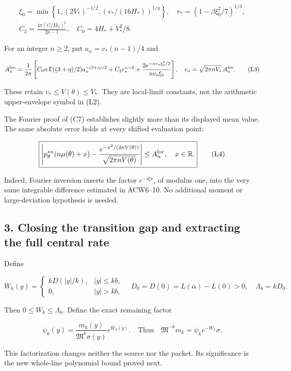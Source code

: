\[
\begin{gathered}
\xi_0=\min\left\{1,(2V_*)^{-1/2},
(v_*/(16H_*))^{1/\eta}\right\},\quad
r_*=(1-\beta\xi_0^2/7)^{1/3},\\
C_2=\frac{4\pi(C/M_0)^2}{2p-1},\quad C_0=4H_*+V_*^2/8.
\end{gathered}
\]

For an integer \(n\ge2\), put \(a_n=v_*(n-1)/4\) and

\[
A_n^{\rm loc}=\frac1{2\pi}\left[
C_0n\,\Gamma((3+\eta)/2)a_n^{-(3+\eta)/2}
+C_2r_*^{n-2}+
\frac{2e^{-nv_*\xi_0^2/2}}{nv_*\xi_0}\right],
\quad\epsilon_n=\sqrt{2\pi nV_*}\,A_n^{\rm loc}.
\tag{L3}
\]

These retain \(v_*\le V(\theta)\le V_*\). They are local-limit constants, not the arithmetic upper-envelope symbol in (L2).

The Fourier proof of (C7) establishes slightly more than its displayed mean value. The same absolute error holds at every shifted evaluation point:

\[
\boxed{\left|p_\theta^{*n}(n\mu(\theta)+x)
-\frac{e^{-x^2/(2nV(\theta))}}{\sqrt{2\pi nV(\theta)}}\right|
\le A_n^{\rm loc},\quad x\in\mathbb R.}
\tag{L4}
\]

Indeed, Fourier inversion inserts the factor \(e^{-i\xi x}\), of modulus one, into the very same integrable difference estimated in ACW6--10. No additional moment or large-deviation hypothesis is needed.

\subsection{3. Closing the transition gap and extracting the full central rate}\label{loc:closing-the-transition-gap-and-extracting-the-full-central-rate}

Define

\[
W_k(y)=\begin{cases}kD(|y|/k),&|y|\le kb,\\0,&|y|>kb,
\end{cases}\quad
D_0=D(0)=L(\alpha)-L(0)>0,\quad\Lambda_k=kD_0.
\tag{L5}
\]

Then \(0\le W_k\le\Lambda_k\). Define the exact remaining factor

\[
\psi_k(y)=\frac{m_k(y)}{\mathfrak M^k\sigma(y)}e^{W_k(y)}.
\quad\text{Thus}\quad
\boxed{\mathfrak M^{-k}m_k=\psi_k e^{-W_k}\sigma.}
\tag{L6}
\]

This factorization changes neither the source nor the packet. Its significance is the new whole-line polynomial bound proved next.

